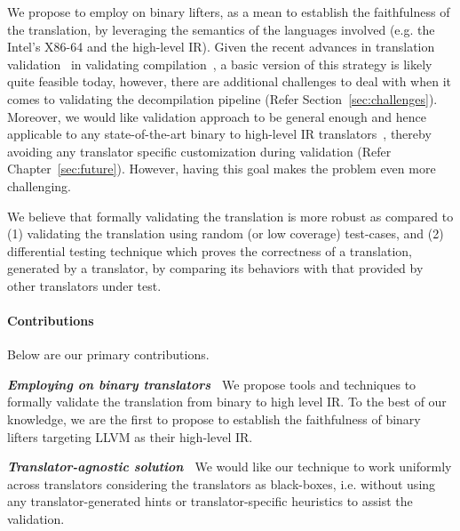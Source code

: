 We propose to employ \tv on binary lifters, as a mean to establish the
faithfulness of the translation, by leveraging the semantics of the languages
involved (e.g. the Intel's X86-64 and the high-level IR).  Given the recent
advances in translation validation~\cite{Pnueli:1998} in validating
compilation~\cite{Necula:2000,Pnueli:1998,Stepp:2011,Tristan:2011,VOC2002,TVOC:CAV2005},
  a basic version of this strategy is likely quite feasible today, however,
  there are additional challenges to deal with when it comes to validating the
  decompilation pipeline (Refer Section~\ref{sec:challenges}). Moreover, we
  would like validation approach to be general enough and hence applicable to
  any state-of-the-art binary to high-level IR
  translators~\cite{McSema:Recon14,Remill,FCD,reopt,llvm-mctoll,BAP:CAV11,Angr1},
  thereby avoiding any translator specific customization during validation
  (Refer Chapter~\ref{sec:future}).  However, having this goal makes the
  problem even more challenging.

We believe that formally validating the translation is more robust as compared
to (1) validating the translation using random (or low coverage) test-cases,
   and (2) differential testing technique which proves the correctness of a
   translation, generated by a translator, by comparing its behaviors with that
   provided by other translators under test. 

\paragraph{Contributions}
Below are our primary contributions.

\textbf{\emph{Employing \tv on binary translators~}} We propose tools and
techniques to formally validate the translation from binary to high level IR.
To the best of our knowledge, we are the first to propose \tv to establish the
faithfulness of binary lifters targeting LLVM as their high-level IR.

\textbf{\emph{Translator-agnostic solution~}} We would like our technique to
work uniformly across translators considering the translators as black-boxes,
     i.e. without using any translator-generated hints  or translator-specific
     heuristics to assist the validation.


